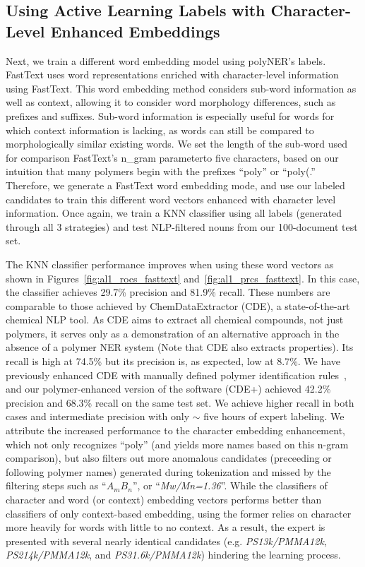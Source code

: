 \subsection{Using Active Learning Labels with Character-Level Enhanced Embeddings}
Next, we train a different word embedding model using polyNER's labels.
FastText uses word representations enriched with character-level information using FastText.
This word embedding method considers sub-word information as well as
context, allowing it to consider word morphology differences, such as prefixes
and suffixes. Sub-word information is especially useful for words for which
context information is lacking, as words can still be compared to morphologically similar
existing words. We set the length of the sub-word used for comparison\textemdash
FastText's n_gram parameter\textemdash to five characters, based on our intuition that
many polymers begin with the prefixes ``poly'' or ``poly(.'' \\
Therefore, we generate a FastText word embedding mode, and use our labeled candidates to train this different word vectors enhanced with character level information.
Once again, we train a KNN classifier using all labels (generated through all 3 strategies)
 and test NLP-filtered nouns from our 100-document test set.


The KNN classifier performance improves when using these word vectors as shown in Figures~\ref{fig:al1_rocs_fasttext} and~\ref{fig:al1_prcs_fasttext}.
In this case, the classifier achieves 29.7\% precision and 81.9\% recall. 
These numbers are comparable to those achieved by ChemDataExtractor (CDE), a state-of-the-art chemical NLP tool.
As CDE aims to extract all
chemical compounds, not just polymers, it serves only as a demonstration of an
alternative approach in the absence of a polymer NER system (Note that CDE also extracts properties). 
Its recall is high
at 74.5\% but its precision is, as expected, low at 8.7\%. 
We have previously enhanced CDE with
manually defined polymer identification rules~\cite{tchoua2017towards},
and our polymer-enhanced version of the software (CDE+) achieved 42.2\% precision and 68.3\% recall on the same test set. 
We achieve higher recall in both cases and intermediate precision with only $\sim$ five hours of expert labeling.
We attribute the increased performance to the character embedding enhancement, which not only recognizes ``poly'' (and yields more names based on this n-gram comparison), but also filters out more anomalous candidates (preceeding or following polymer names) generated during tokenization and missed by the filtering steps such as ``\textit{$A_mB_n$}'', or ``\textit{Mw/Mn=1.36}''.  
While the classifiers of character and word (or context) embedding vectors performs better than classifiers of only context-based embedding, using the former relies on character more heavily for words with little to no context.
As a result, the expert is presented with several nearly identical candidates (e.g. \textit{PS13k/PMMA12k}, \textit{PS214k/PMMA12k}, and \textit{PS31.6k/PMMA12k}) hindering the learning process.

